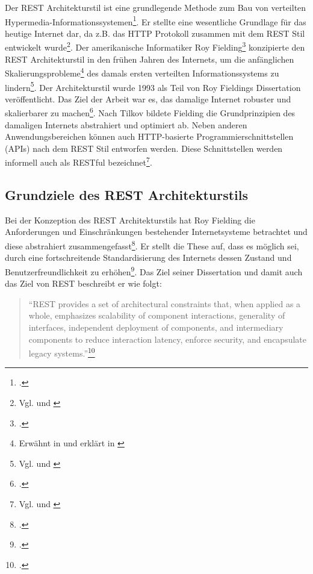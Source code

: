 Der REST Architekturstil ist eine grundlegende Methode zum Bau von verteilten Hypermedia-Informationssystemen\footcite[Vgl. ][S. 76]{fielding_architectural_2000}. Er stellte eine wesentliche Grundlage für das heutige Internet dar, da z.B. das HTTP Protokoll zusammen mit dem REST Stil entwickelt wurde\footnote{Vgl. \cite{fielding_hypertext_1999} und \cite[S. 9]{tilkov_rest_2015}}. Der amerikanische Informatiker Roy Fielding\footcite[Vgl. ][]{fielding_roy_2021} konzipierte den REST Architekturstil in den frühen Jahren des Internets, um die anfänglichen Skalierungsprobleme\footnote{Erwähnt in \cite{fielding_architectural_2000} und  erklärt in \cite{berners-lee_world-wide_1994}} des damals ersten verteilten Informationssystems zu lindern\footnote{Vgl. \cite[S. 1]{fielding_architectural_2000} und \cite[S. 9]{tilkov_rest_2015}}. Der Architekturstil wurde 1993 als Teil von Roy Fieldings Dissertation veröffentlicht. Das Ziel der Arbeit war es, das damalige Internet robuster und skalierbarer zu machen\footcite[Vgl. ][S. 3]{fielding_architectural_2000}. Nach Tilkov bildete Fielding die Grundprinzipien des damaligen Internets abstrahiert und optimiert ab. Neben anderen Anwendungsbereichen können auch HTTP-basierte Programmierschnittstellen (APIs) nach dem REST Stil entworfen werden. Diese Schnittstellen werden informell auch als RESTful bezeichnet\footnote{Vgl. \cite{rodriguez_restful_2008} und \cite[S. 10]{tilkov_rest_2015}}. 

\subsection{Grundziele des REST Architekturstils}\label{subsection:grundziele-des-rest}

Bei der Konzeption des REST Architekturstils hat Roy Fielding die Anforderungen und Einschränkungen bestehender Internetsysteme betrachtet und diese abstrahiert zusammengefasst\footcite[Vgl. ][S. 76]{fielding_architectural_2000}. Er stellt die These auf, dass es möglich sei, durch eine fortschreitende Standardisierung des Internets dessen Zustand und Benutzerfreundlichkeit zu erhöhen\footcite[Vgl. ][S. 73f]{fielding_architectural_2000}. Das Ziel seiner Dissertation und damit auch das Ziel von REST beschreibt er wie folgt:

\begin{quote}
    \enquote{REST provides a set of architectural constraints that, when applied as a whole, emphasizes scalability of component interactions, generality of interfaces, independent deployment of components, and intermediary components to reduce interaction latency, enforce security, and encapsulate legacy systems.}\footcite[Vgl. ][S. 75]{fielding_architectural_2000}
\end{quote}


